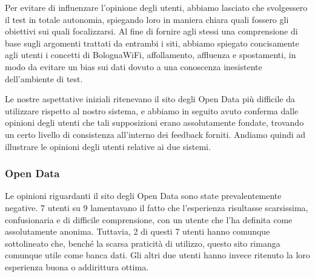 Per evitare di influenzare l'opinione degli utenti, abbiamo lasciato che svolgessero il test in totale autonomia, spiegando loro in maniera chiara quali fossero gli obiettivi sui quali focalizzarsi. Al fine di fornire agli stessi una comprensione di base sugli argomenti trattati da entrambi i siti, abbiamo spiegato concisamente agli utenti i concetti di BolognaWiFi, affollamento, affluenza e spostamenti, in modo da evitare un bias sui dati dovuto a una conoscenza inesistente dell'ambiente di test.

Le nostre aspettative iniziali ritenevano il sito degli Open Data più difficile da utilizzare rispetto al nostro sistema, e abbiamo in seguito avuto conferma dalle opinioni degli utenti che tali supposizioni erano assolutamente fondate, trovando un certo livello di consistenza all'interno dei feedback forniti. Andiamo quindi ad illustrare le opinioni degli utenti relative ai due sistemi.

\subsubsection{Open Data}
Le opinioni riguardanti il sito degli Open Data sono state prevalentemente negative. 7 utenti su 9 lamentavano il fatto che l'esperienza risultasse scarsissima, confusionaria e di difficile comprensione, con un utente che l'ha definita come assolutamente anonima. Tuttavia, 2 di questi 7 utenti hanno comunque sottolineato che, benché la scarsa praticità di utilizzo, questo sito rimanga comunque utile come banca dati. Gli altri due utenti hanno invece ritenuto la loro esperienza buona o addirittura ottima.


